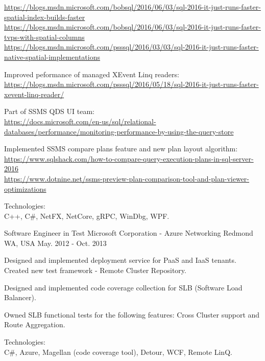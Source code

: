 \begin{cventries}
{\begin{cvitems}
{      \scriptsize
      \url{https://blogs.msdn.microsoft.com/bobsql/2016/06/03/sql-2016-it-just-runs-faster-spatial-index-builds-faster} \\
      \url{https://blogs.msdn.microsoft.com/bobsql/2016/06/03/sql-2016-it-just-runs-faster-tvps-with-spatial-columns} \\
      \url{https://blogs.msdn.microsoft.com/psssql/2016/03/03/sql-2016-it-just-runs-faster-native-spatial-implementations}
      }
    \item
    {
      Improved peformance of managed XEvent Linq readers: \\
      \scriptsize
      \url {https://blogs.msdn.microsoft.com/psssql/2016/05/18/sql-2016-it-just-runs-faster-xevent-linq-reader/}
    }
    \item
    { 
      Part of SSMS QDS UI team: \\
      \scriptsize
      \url {https://docs.microsoft.com/en-us/sql/relational-databases/performance/monitoring-performance-by-using-the-query-store}
    }
    \item
    {
      Implemented SSMS compare plans feature and new plan layout algorithm: \\
      \scriptsize
      \url {https://www.sqlshack.com/how-to-compare-query-execution-plans-in-sql-server-2016} \\
      \url {https://www.dotnine.net/ssms-preview-plan-comparison-tool-and-plan-viewer-optimizations}
    }
    \item
    {
      Technologies: \\
      C++, {C\#}, NetFX, NetCore, gRPC, WinDbg, WPF.
    }
  \end{cvitems}
}

\cventry
{Software Engineer in Test} %
{Microsoft Corporation - Azure Networking} %
{Redmond WA, USA} %
{May. 2012 - Oct. 2013} %
{
  \begin{cvitems} %
    \item
    {
      Designed and implemented deployment service for PaaS and IaaS tenants. 
      Created new test framework - Remote Cluster Repository.
    }
    \item
    {
      Designed and implemented code coverage collection for SLB (Software Load Balancer).
    }
    \item
    {
      Owned SLB functional tests for the following features:
      Cross Cluster support and Route Aggregation.
    }
    \item
    {
      Technologies: \\
      {C\#}, Azure, Magellan (code coverage tool), Detour, WCF, Remote LinQ.
    }
  \end{cvitems}
}


\end{cventries}
